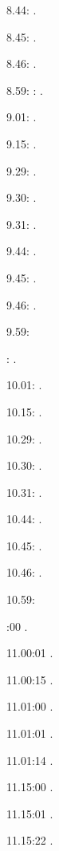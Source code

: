 \label{key}\documentclass[italian]{article}
\begin{document}
8.44:   .

8.45:   .

8.46:   .

8.59:   
:  .

9.01:   . 

9.15:   . 

9.29:   . 

9.30:   .

9.31:   .

9.44:   .

9.45:   .

9.46:   .

9.59:   

:  .

10.01:   . 

10.15:   . 

10.29:   . 

10.30:   .

10.31:   .

10.44:   .

10.45:   .

10.46:   .

10.59:   

:00  .

11.00:01  .

11.00:15  .

11.01:00   . 

11.01:01   . 

11.01:14   . 

11.15:00   . 

11.15:01   . 

11.15:22   . 
\end{document}
